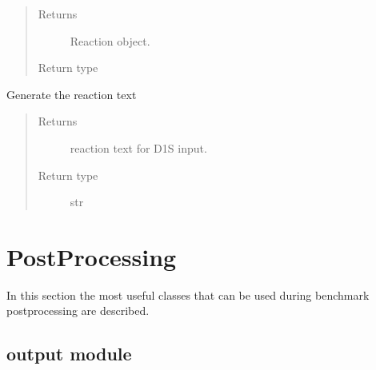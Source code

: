 \documentclass[letterpaper,10pt,english]{sphinxmanual}
\begin{document}
\begin{fulllineitems}
\begin{fulllineitems}
\begin{quote}
\begin{description}
\begin{itemize}
\end{itemize}

\item[{Returns}] \leavevmode
Reaction object.

\item[{Return type}] \leavevmode
{\hyperref[\detokenize{api/inputgeneration:parsersD1S.Reaction}]{}}

\end{description}\end{quote}

\end{fulllineitems}


\begin{fulllineitems}
\label{\detokenize{api/inputgeneration:parsersD1S.Reaction.write}}
Generate the reaction text
\begin{quote}\begin{description}
\item[{Returns}] \leavevmode
{} \textendash{} reaction text for D1S input.

\item[{Return type}] \leavevmode
str

\end{description}\end{quote}

\end{fulllineitems}


\end{fulllineitems}



\chapter{Post\sphinxhyphen{}Processing}
\label{\detokenize{api/postprocessing:post-processing}}\label{\detokenize{api/postprocessing::doc}}
In this section the most useful classes that can be used during benchmark
post\sphinxhyphen{}processing are described.


\section{output module}
\label{\detokenize{api/postprocessing:output-module}}
\end{document}

